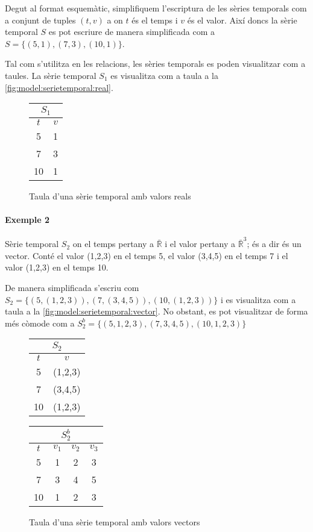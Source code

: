Degut al format esquemàtic, simplifiquem l'escriptura de les sèries temporals com a conjunt de tuples $(t,v)$ a on $t$ és el temps i $v$ és el valor. Així doncs la sèrie temporal $S$ es pot escriure de manera simplificada com a 
$S = \{ (5,1), (7,3), (10,1) \}$.

Tal com s'utilitza en les relacions, les sèries temporals es poden visualitzar com a taules. La sèrie temporal $S_1$ es visualitza com a taula a la \autoref{fig:model:serietemporal:real}.

\begin{figure}[tp]
  \centering
  \begin{tabular}{|c|c|}
    \multicolumn{2}{c}{$S_1$} \\ \hline
    $t$  & $v$ \\ \hline
    5  & 1 \\
    7  & 3 \\
    10 & 1 \\ \hline
  \end{tabular}
  \caption{Taula d'una sèrie temporal amb valors reals}
  \label{fig:model:serietemporal:real}
\end{figure}


\paragraph{Exemple 2}
Sèrie temporal $S_2$ on el temps pertany a $\bar{\mathbb{R}}$ i el valor pertany a  $\bar{\mathbb{R}}^3$; és a dir és un vector. Conté el valor (1,2,3) en el temps 5, el valor (3,4,5) en el temps 7 i el valor (1,2,3) en el temps 10.

De manera simplificada s'escriu com 
$S_2 = \{ (5,(1,2,3)), (7,(3,4,5)), (10,(1,2,3)) \}$ i es visualitza com a taula a la \autoref{fig:model:serietemporal:vector}. No obstant, es pot visualitzar de forma més còmode com a $S_2^b = \{ (5,1,2,3), (7,3,4,5), (10,1,2,3) \}$

\begin{figure}[tp]
  \centering
  \begin{tabular}{|c|c|}
    \multicolumn{2}{c}{$S_2$} \\ \hline
    $t$  & $v$ \\ \hline
    5  & (1,2,3) \\
    7  & (3,4,5) \\
    10 & (1,2,3) \\ \hline
  \end{tabular} \qquad
  \begin{tabular}[tp]{|c|c|c|c|}
   \multicolumn{4}{c}{$S_2^b$} \\ \hline
    $t$  & $v_1$ & $v_2$ & $v_3$ \\ \hline
    5  & 1 & 2 & 3 \\
    7  & 3 & 4 & 5 \\
    10 & 1 & 2 & 3 \\ \hline
  \end{tabular}

  \caption{Taula d'una sèrie temporal amb valors vectors}
  \label{fig:model:serietemporal:vector}
\end{figure}


